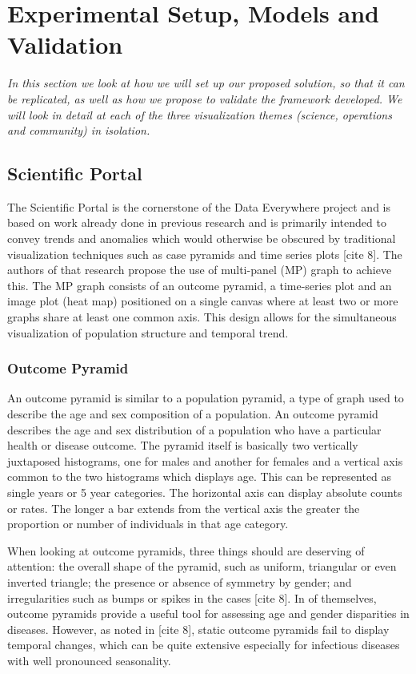 \chapter{Experimental Setup, Models and Validation}
\label{chap5}
\textit{In this section we look at how we will set up our proposed solution, so that it can be replicated, as well as how we propose to validate the framework developed. We will look in detail at each of the three visualization themes (science, operations and community) in isolation.}
\vspace{2ex}\vfill
\minitoc
\newpage

\section{Scientific Portal}
The Scientific Portal is the cornerstone of the Data Everywhere project and is based on work already done in previous research and is primarily intended to convey trends and anomalies which would otherwise be obscured by traditional visualization techniques such as case pyramids and time series plots [cite 8]. The authors of that research propose the use of multi-panel (MP) graph to achieve this. The MP graph consists of an outcome pyramid, a time-series plot and an image plot (heat map) positioned on a single canvas where at least two or more graphs share at least one common axis. This design allows for the simultaneous visualization of population structure and temporal trend.

\subsection{Outcome Pyramid}

An outcome pyramid is similar to a population pyramid, a type of graph used to describe the age and sex composition of a population. An outcome pyramid describes the age and sex distribution of a population who have a particular health or disease outcome. The pyramid itself is basically two vertically juxtaposed histograms, one for males and another for females and a vertical axis common to the two histograms which displays age. This can be represented as single years or 5 year categories. The horizontal axis can display absolute counts or rates. The longer a bar extends from the vertical axis the greater the proportion or number of individuals in that age category.

When looking at outcome pyramids, three things should are deserving of attention: the overall shape of the pyramid, such as uniform, triangular or even inverted triangle; the presence or absence of symmetry by gender; and irregularities such as bumps or spikes in the cases [cite 8]. In of themselves, outcome pyramids provide a useful tool for assessing age and gender disparities in diseases. However, as noted in [cite 8], static outcome pyramids fail to display temporal changes, which can be quite extensive especially for infectious diseases with well pronounced seasonality.

